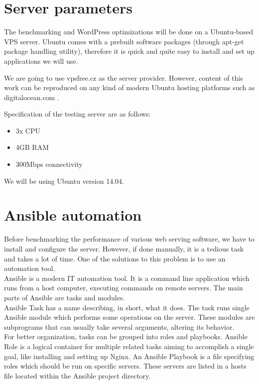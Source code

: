 \section{Server parameters}

The benchmarking and WordPress optimizations will be done on a Ubuntu-based VPS server. Ubuntu comes with a prebuilt software packages (through apt-get package handling utility), therefore it is quick and quite easy to install and set up applications we will use.

We are going to use vpsfree.cz \cite{Hosting:vpsfree.cz} as the server provider. However, content of this work can be reproduced on any kind of modern Ubuntu hosting platforms such as digitalocean.com \cite{Hosting:do.com}.

Specification of the testing server are as follows:
\begin{itemize}
	\item 3x CPU
	\item 4GB RAM
	\item 300Mbps connectivity
\end{itemize}

We will be using Ubuntu version 14.04.

\section{Ansible automation}

Before benchmarking the performance of various web serving software, we have to install and configure the server. However, if done manually, it is a tedious task and takes a lot of time. One of the solutions to this problem is to use an automation tool. \\

Ansible is a modern IT automation tool. It is a command line application which runs from a host computer, executing commands on remote servers. The main parts of Ansible are tasks and modules. \\

Ansible Task has a name describing, in short, what it does. The task runs single Ansible module which performs some operations on the server. These modules are subprograms that can usually take several arguments, altering its behavior. \\

For better organization, tasks can be grouped into roles and playbooks. Ansible Role is a logical container for multiple related tasks aiming to accomplish a single goal, like installing and setting up Nginx.  An Ansible Playbook is a file specifying roles which should be run on specific servers. These servers are listed in a hosts file located within the Ansible project directory. \\

